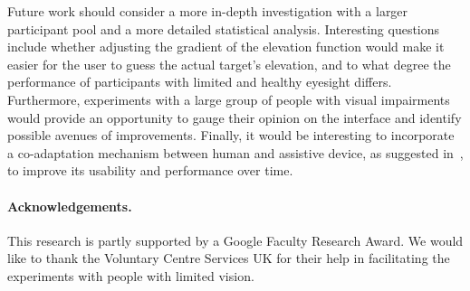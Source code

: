 \documentclass{llncs}
\begin{document}
Future work should consider a more in-depth investigation with a larger participant pool and a more detailed statistical analysis.
Interesting questions include whether adjusting the gradient of the elevation function would make it easier for the user to guess the actual target's elevation, and to what degree the performance of participants with limited and healthy eyesight differs.
Furthermore, experiments with a large group of people with visual impairments would provide an opportunity to gauge their opinion on the interface and identify possible avenues of improvements.
Finally, it would be interesting to incorporate a co-adaptation mechanism between human and assistive device, as suggested in~\cite{gallina2015progressive}, to improve its usability and performance over time.

\paragraph{{\bf Acknowledgements.}}\label{sec:acknowledge}
This research is partly supported by a Google Faculty Research Award.
We would like to thank the Voluntary Centre Services UK for their help in facilitating the experiments with people with limited vision. 



\end{document}
